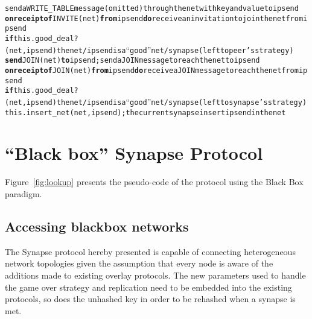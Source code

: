 \begin{figure*}[!t]
{\begin{alltt}
\hfill{\rm send a WRITE\_TABLE message (omitted) through the net with key and value to ipsend}
\NA
\AL \textbf{on receipt of} INVITE(net) \textbf{from} ipsend \textbf{do} \hfill{\rm receive an invitation to join the net from ipsend}
\AL   \textbf{if} this.good_deal?(net,ipsend)\hfill{\rm the net/ipsend is a  ``good'' net/synapse (left to peer's strategy)}
\AL     \textbf{send} JOIN(net) \textbf{to} ipsend;  \hfill {\rm send a JOIN message to reach the net to ipsend}
\NA
\AL \textbf{on receipt of} JOIN(net) \textbf{from} ipsend\textbf{do}\hfill{\rm receive a JOIN message to reach the net from ipsend}
\AL   \textbf{if} this.good_deal?(net,ipsend)\hfill{\rm  the net/ipsend is a  ``good'' net/synapse (left to synapse's strategy)}
\AL     this.insert_net(net,ipsend);\hfill{\rm the current synapse insert ipsend in the net}
\end{alltt}}
\caption{The Synapse white box protocol \label{fig:lookup}}
\end{figure*}





\section{``Black box'' Synapse Protocol}
%
Figure~\ref{fig:lookup} presents the pseudo-code of the protocol using
the Black Box paradigm.

\subsection{Accessing blackbox networks}
%
The Synapse protocol hereby presented is capable of connecting
heterogeneous network topologies given the assumption that every node
is aware of the additions made to existing overlay protocols. The new
parameters used to handle the game over strategy and replication need
to be embedded into the existing protocols, so does the unhashed key
in order to be rehashed when a synapse is met.

